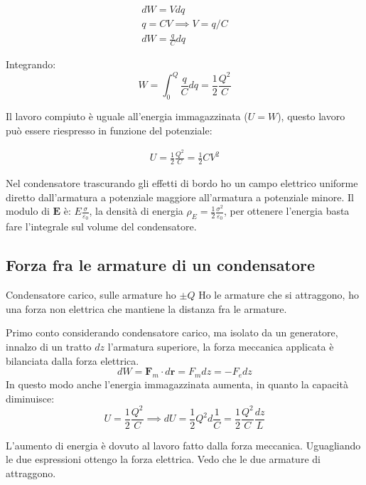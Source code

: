 \documentclass[a4paper]{scrarticle}
\begin{document}
\begin{gather*}
    dW = V dq\\
    q = CV\implies V = q/C \\
    dW = \frac{q}{C} dq    
\end{gather*}

Integrando:
\begin{equation}
    W = \int_{0}^{Q} \frac{q}{C} dq = \frac{1}{2}\frac{Q^2}{C}
\end{equation}

Il lavoro compiuto è uguale all'energia immagazzinata ($U  = W$), questo lavoro può essere riespresso in funzione del potenziale:

\begin{gather*}
    U = \frac{1}{2} \frac{Q^2}{C} = \frac{1}{2} CV^2
\end{gather*}

Nel condensatore trascurando gli effetti di bordo ho un campo elettrico uniforme diretto dall'armatura a potenziale maggiore all'armatura a potenziale minore.
Il modulo di $\bm E$ è: $E \frac{\sigma}{\varepsilon_0}$, la densità di energia $\rho_E = \frac{1}{2}\frac{\sigma^2}{\varepsilon_0}$, per ottenere l'energia basta fare l'integrale sul volume del condensatore.

\subsection{Forza fra le armature di un condensatore}

Condensatore carico, sulle armature ho $\pm Q$
Ho le armature che si attraggono, ho una forza non elettrica che mantiene la distanza fra le armature.

Primo conto considerando condensatore carico, ma isolato da un generatore, innalzo di un tratto $dz$ l'armatura superiore, la forza meccanica applicata è bilanciata dalla forza elettrica.
\begin{equation*}
    dW = \bm F_m \cdot d\bm r = F_m dz = - F_e dz
\end{equation*}
In questo modo anche l'energia immagazzinata aumenta, in quanto la capacità diminuisce:
\begin{equation*}
    U = \frac{1}{2}\frac{Q^2}{C} \implies dU = \frac{1}{2}Q^2 d \frac{1}{C} = \frac{1}{2}\frac{Q^2}{C}\frac{dz}{L}
\end{equation*}

L'aumento di energia è dovuto al lavoro fatto dalla forza meccanica. Uguagliando le due espressioni ottengo la forza elettrica.
Vedo che le due armature di attraggono.
\end{document}
